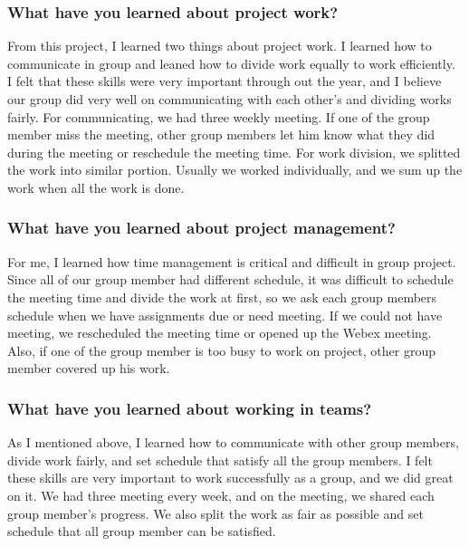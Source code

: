 \documentclass[article, onecolumn, draftclsnofoot,10pt, compsoc]{IEEEtran}
\begin{document}
\subsubsection{What have you learned about project work?}
From this project, I learned two things about project work. I learned how to communicate in group and leaned how to divide work equally to work efficiently. I felt that these skills were very important through out the year, and I believe our group did very well on communicating with each other’s and dividing works fairly. For communicating, we had three weekly meeting. If one of the group member miss the meeting, other group members let him know what they did during the meeting or reschedule the meeting time. For work division, we splitted the work into similar portion. Usually we worked individually, and we sum up the work when all the work is done.

\subsubsection{What have you learned about project management?}
For me, I learned how time management is critical and difficult in group project. Since all of our group member had different schedule, it was difficult to schedule the meeting time and divide the work at first, so we ask each group members schedule when we have assignments due or need meeting. If we could not have meeting, we rescheduled the meeting time or opened up the Webex meeting. Also, if one of the group member is too busy to work on project, other group member covered up his work.

\subsubsection{What have you learned about working in teams?}
As I mentioned above, I learned how to communicate with other group members, divide work fairly, and set schedule that satisfy all the group members. I felt these skills are very important to work successfully as a group, and we did great on it. We had three meeting every week, and on the meeting, we shared each group member’s progress. We also split the work as fair as possible and set schedule that all group member can be satisfied.
\end{document}

